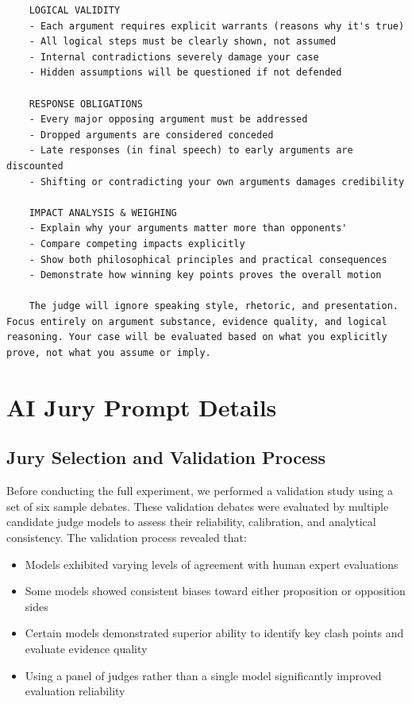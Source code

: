 \documentclass{article}
\begin{document}
\begin{verbatim}
    LOGICAL VALIDITY
    - Each argument requires explicit warrants (reasons why it's true)
    - All logical steps must be clearly shown, not assumed
    - Internal contradictions severely damage your case
    - Hidden assumptions will be questioned if not defended

    RESPONSE OBLIGATIONS
    - Every major opposing argument must be addressed
    - Dropped arguments are considered conceded
    - Late responses (in final speech) to early arguments are discounted
    - Shifting or contradicting your own arguments damages credibility

    IMPACT ANALYSIS & WEIGHING
    - Explain why your arguments matter more than opponents'
    - Compare competing impacts explicitly
    - Show both philosophical principles and practical consequences
    - Demonstrate how winning key points proves the overall motion

    The judge will ignore speaking style, rhetoric, and presentation. Focus entirely on argument substance, evidence quality, and logical reasoning. Your case will be evaluated based on what you explicitly prove, not what you assume or imply.

  \end{verbatim}




\section{AI Jury Prompt Details}
\label{appendix:judge_prompt}

\subsection{Jury Selection and Validation Process}

Before conducting the full experiment, we performed a validation study using a set of six sample debates. These validation debates were evaluated by multiple candidate judge models to assess their reliability, calibration, and analytical consistency. The validation process revealed that:

\begin{itemize}
    \item Models exhibited varying levels of agreement with human expert evaluations
    \item Some models showed consistent biases toward either proposition or opposition sides
    \item Certain models demonstrated superior ability to identify key clash points and evaluate evidence quality
    \item Using a panel of judges rather than a single model significantly improved evaluation reliability
\end{itemize}
\end{document}
